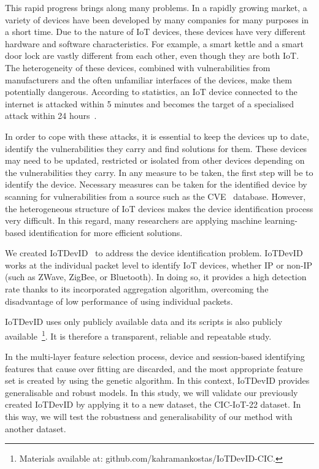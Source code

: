 \documentclass[journal]{IEEEtran}
\begin{document}
This rapid progress brings along many problems.  In a rapidly growing market, a variety of devices have been developed by many companies for many purposes in a short time. Due to the nature of IoT devices, these devices have very different hardware and software characteristics.  For example, a smart kettle and a smart door lock are vastly different from each other, even though they are both IoT. The heterogeneity of these devices, combined with vulnerabilities from manufacturers and the often unfamiliar interfaces of the devices, make them potentially dangerous. According to statistics, an IoT device connected to the internet is attacked within 5 minutes and becomes the target of a specialised attack within 24 hours~\cite{modi_2019}. 


In order to cope with these attacks, it is essential to keep the devices up to date, identify the vulnerabilities they carry and find solutions for them. These devices may need to be updated, restricted or isolated from other devices depending on the vulnerabilities they carry. In any measure to be taken, the first step will be to identify the device. Necessary measures can be taken for the identified device by scanning for vulnerabilities from a source such as the CVE~\cite{cve} database.  However, the heterogeneous structure of IoT devices makes the device identification process very difficult. In this regard, many researchers are applying machine learning-based identification for more efficient solutions. 

We created IoTDevID~\cite{kostas2022IoTDevID} to address the device identification problem. IoTDevID works at the individual packet level to identify IoT devices, whether IP or non-IP (such as ZWave, ZigBee, or Bluetooth). In doing so, it provides a high detection rate thanks to its incorporated aggregation algorithm, overcoming the disadvantage of low performance of using individual packets.


IoTDevID uses only publicly available data and its scripts is also publicly available~\footnote{Materials available at: github.com/kahramankostas/IoTDevID-CIC.}. It is therefore a transparent, reliable and repeatable study.

In the multi-layer feature selection process, device and session-based identifying features that cause over fitting are discarded, and the most appropriate feature set is created by using the genetic algorithm. In this context, IoTDevID provides generalisable and robust models.  In this study, we will validate our previously created IoTDevID by applying it to a new dataset, the CIC-IoT-22 dataset. In this way, we will test the robustness and generalisability of our method with another dataset.
\end{document}
